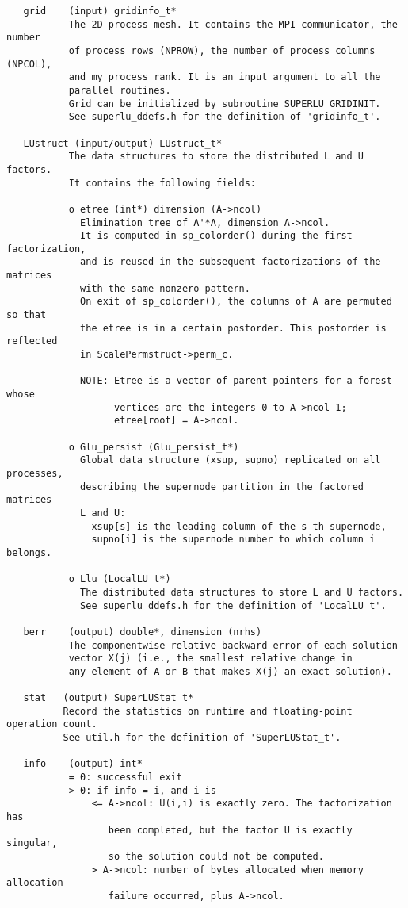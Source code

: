 \begin{verbatim}
   grid    (input) gridinfo_t*
           The 2D process mesh. It contains the MPI communicator, the number
           of process rows (NPROW), the number of process columns (NPCOL),
           and my process rank. It is an input argument to all the
           parallel routines.
           Grid can be initialized by subroutine SUPERLU_GRIDINIT.
           See superlu_ddefs.h for the definition of 'gridinfo_t'.
  
   LUstruct (input/output) LUstruct_t*
           The data structures to store the distributed L and U factors.
           It contains the following fields:
  
           o etree (int*) dimension (A->ncol)
             Elimination tree of A'*A, dimension A->ncol.
             It is computed in sp_colorder() during the first factorization,
             and is reused in the subsequent factorizations of the matrices
             with the same nonzero pattern.
             On exit of sp_colorder(), the columns of A are permuted so that
             the etree is in a certain postorder. This postorder is reflected
             in ScalePermstruct->perm_c.

             NOTE: Etree is a vector of parent pointers for a forest whose 
                   vertices are the integers 0 to A->ncol-1;
                   etree[root] = A->ncol.
  
           o Glu_persist (Glu_persist_t*)
             Global data structure (xsup, supno) replicated on all processes,
             describing the supernode partition in the factored matrices
             L and U:
               xsup[s] is the leading column of the s-th supernode,
               supno[i] is the supernode number to which column i belongs.
  
           o Llu (LocalLU_t*)
             The distributed data structures to store L and U factors.
             See superlu_ddefs.h for the definition of 'LocalLU_t'.
  
   berr    (output) double*, dimension (nrhs)
           The componentwise relative backward error of each solution   
           vector X(j) (i.e., the smallest relative change in   
           any element of A or B that makes X(j) an exact solution).
  
   stat   (output) SuperLUStat_t*
          Record the statistics on runtime and floating-point operation count.
          See util.h for the definition of 'SuperLUStat_t'.
  
   info    (output) int*
           = 0: successful exit
           > 0: if info = i, and i is
               <= A->ncol: U(i,i) is exactly zero. The factorization has
                  been completed, but the factor U is exactly singular,
                  so the solution could not be computed.
               > A->ncol: number of bytes allocated when memory allocation
                  failure occurred, plus A->ncol.
  
\end{verbatim}


